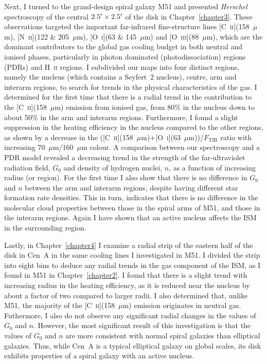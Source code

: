 Next, I turned to the grand-design spiral galaxy M51 and presented \emph{Herschel} spectroscopy of the central $2.5\mbox{$^\prime$} \times 2.5\mbox{$^\prime$}$ of the disk in Chapter~\ref{chapter3}.  These observations targeted the important far-infrared fine-structure lines [C~\textsc{ii}](158~$\mu$m), [N~\textsc{ii}](122 \& 205~$\mu$m), [O~\textsc{i}](63 \& 145~$\mu$m) and [O~\textsc{iii}](88~$\mu$m), which are the dominant contributors to the global gas cooling budget in both neutral and ionised phases, particularly in photon dominated (photodissociation) regions (PDRs) and H~\textsc{ii} regions.  I subdivided our maps into four distinct regions, namely the nucleus (which contains a Seyfert~2 nucleus), centre, arm and interarm regions, to search for trends in the physical characteristics of the gas.  I determined for the first time that there is a radial trend in the contribution to the [C~\textsc{ii}](158~$\mu$m) emission from ionised gas, from 80\% in the nucleus down to about 50\% in the arm and interarm regions.  Furthermore, I found a slight suppression in the heating efficiency in the nucleus compared to the other regions, as shown by a decrease in the ([C~\textsc{ii}](158~$\mu$m)+[O~\textsc{i}](63~$\mu$m))/$F_{\mathrm{TIR}}$ ratio with increasing 70~$\mu$m/160~$\mu$m colour.  A comparison between our spectroscopy and a PDR model revealed a decreasing trend in the strength of the far-ultraviolet radiation field, $G_{0}$ and density of hydrogen nuclei, $n$, as a function of increasing radius (or region).  For the first time I also show that there is no difference in $G_{0}$ and $n$ between the arm and interarm regions, despite having different star formation rate densities.  This in turn, indicates that there is no difference in the molecular cloud properties between those in the spiral arms of M51, and those in the interarm regions.  Again I have shown that an active nucleus affects the ISM in the surrounding region.

Lastly, in Chapter~\ref{chapter4} I examine a radial strip of the eastern half of the disk in Cen~A in the same cooling lines I investigated in M51.  I divided the strip into eight bins to deduce any radial trends in the gas component of the ISM, as I found in M51 in Chapter~\ref{chapter2}.  I found that there is a slight trend with increasing radius in the heating efficiency, as it is reduced near the nucleus by about a factor of two compared to larger radii.  I also determined that, unlike M51, the majority of the [C~\textsc{ii}](158~$\mu$m) emission originates in neutral gas.  Futhermore, I also do not observe any significant radial changes in the values of $G_{0}$ and $n$.  However, the most significant result of this investigation is that the values of $G_{0}$ and $n$ are more consistent with normal spiral galaxies than elliptical galaxies.  Thus, while Cen~A is a typical elliptical galaxy on global scales, its disk exhibits properties of a spiral galaxy with an active nucleus.

